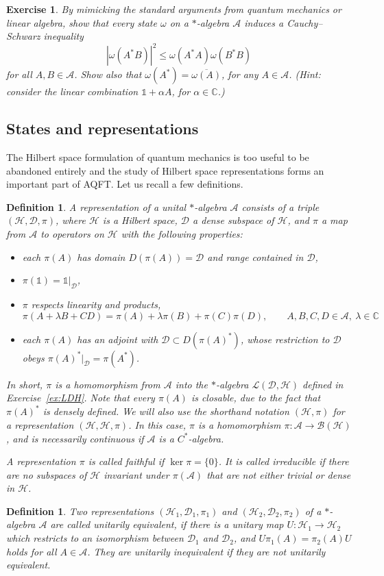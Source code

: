 \documentclass[12pt]{article}
\newcommand{\1}{\mathds{1}}                         %
\newcommand{\CC}{\mathbb{C}}           %
\newcommand{\Hcal}{\mathcal {H}}
\newcommand{\Lcal}{\mathcal {L}}
\newcommand{\Bcal}{\mathcal {B}}
\newcommand{\HH}{{\mathcal{H}}}
\newcommand{\DD}{{\mathscr{D}}}
\newcommand{\II}{{\mathbb{1}}}
\newcommand{\Ac}{{\mathcal{A}}}
\newtheorem{exercise}[theorem]{Exercise}
\newtheorem{df}[theorem]{Definition}}
\begin{document}
\begin{exercise}
	By mimicking the standard arguments from quantum mechanics or linear algebra, show that every state $\omega$ on a $*$-algebra $\Ac$ induces a Cauchy--Schwarz inequality
	\begin{equation}\label{eq:CauchySchwarz}
	|\omega(A^*B)|^2\le \omega(A^*A)\omega(B^*B)
	\end{equation}
	for all $A,B\in\Ac$. Show also that $\omega(A^*)=\overline{\omega(A)}$, for any $A\in\Ac$. (Hint: consider the linear combination $\II+\alpha A$, for $\alpha\in\CC$.)
\end{exercise}



\subsection{States and representations}\label{sec:GNS}
The Hilbert space formulation of quantum mechanics is too useful to be abandoned entirely and the study of Hilbert space representations forms an important part of AQFT. Let us recall a few definitions. 
\begin{df}
	A \emph{representation} of a unital $*$-algebra $\Ac$ consists of
	a triple $(\HH,\DD,\pi)$, where $\HH$ is a Hilbert space, $\DD$ a dense subspace of $\HH$, and $\pi$ a map from $\Ac$ to operators on $\HH$ with the following properties: 
	\begin{itemize}
	    \item each $\pi(A)$ has domain $D(\pi(A))=\DD$ and range contained in $\DD$, 
	    \item $\pi(\II)=\II|_\DD$,
	    \item $\pi$ respects linearity and products,
	    \[
	    \pi(A+\lambda B+CD) = \pi(A) + \lambda\pi(B) + \pi(C)\pi(D), \qquad A,B,C,D\in\Ac,~\lambda\in\CC
	    \]
	    \item each $\pi(A)$ has an adjoint with $\DD\subset D(\pi(A)^*)$,  whose restriction to $\DD$ obeys $\pi(A)^*|_\DD=\pi(A^*)$.
	\end{itemize}
	In short, $\pi$ is a homomorphism  
	from $\Ac$ into the $*$-algebra $\Lcal(\DD,\HH)$ defined in  Exercise~\ref{ex:LDH}. Note that every $\pi(A)$ is closable, due to the fact that $\pi(A)^*$ is densely defined. We will also use the shorthand notation $(\HH,\pi)$ for a representation $(\HH,\HH,\pi)$. In this case, 
	$\pi$ is a homomorphism	$\pi:\Ac\rightarrow\Bcal(\Hcal)$, and is necessarily continuous if $\Ac$ is a $C^*$-algebra.
	
	\noindent A representation $\pi$ is called \emph{faithful} if $\ker \pi=\{0\}$. It is called irreducible if there are no subspaces of $\Hcal$ invariant under $\pi(\Ac)$ that are not either trivial or dense in $\Hcal$.
\end{df} 
\begin{df}
	Two representations $(\HH_1,\DD_1,\pi_1)$ and $(\HH_2,\DD_2,\pi_2)$ of a $*$-algebra $\Ac$ are called \emph{unitarily equivalent}, if
	there is a unitary map $U:\HH_1\rightarrow\HH_2$ which 
	restricts to an isomorphism between $\DD_1$ and $\DD_2$, and 
	$U\pi_1(A)=\pi_2(A) U$ holds for all $A\in\Ac$. They are \emph{unitarily inequivalent} if they are not unitarily equivalent.
\end{df} 
\end{document}
